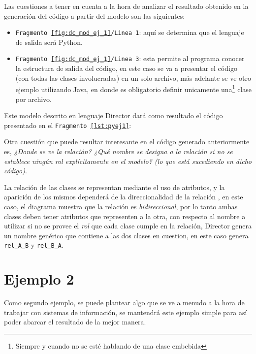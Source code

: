 Las cuestiones a tener en cuenta a la hora de analizar el resultado obtenido en
la generación del código a partir del modelo son las siguientes:
\begin{itemize}
	\item \texttt{Fragmento \ref{fig:dc_mod_ej_1}/Linea 1}: aquí se determina que
		el lenguaje de salida será Python.
	\item \texttt{Fragmento \ref{fig:dc_mod_ej_1}/Linea 3}: esta permite al
		programa conocer la estructura de salida del código, en este caso se va a
		presentar el código (con todas las clases involucradas) en un solo archivo,
		más adelante se ve otro ejemplo utilizando Java, en donde es obligatorio
		definir unicamente una\footnote{Siempre y cuando no se esté hablando de una
		clase embebida} clase por archivo.
\end{itemize}

Este modelo descrito en lenguaje Director dará como resultado el código
presentado en el \texttt{Fragmento \ref{lst:pyej1}}:



Otra cuestión que puede resultar interesante en el código generado
anteriormente es, \textit{¿Donde se ve la relación? ¿Qué nombre se designa a la
relación si no se establece ningún rol explícitamente en el modelo? (lo que
está sucediendo en dicho código)}.

La relación de las clases se representan mediante el uso de atributos, y la
aparición de los mismos dependerá de la direccionalidad de la relación
\cites{seidl2012}{pooii2017}, en este caso, el diagrama muestra que la relación es
\textit{bidireccional}, por lo tanto ambas clases deben tener atributos que
representen a la otra, con respecto al nombre a utilizar si no se provee el
\textit{rol} que cada clase cumple en la relación, Director genera un nombre
genérico que contiene a las dos clases en cuestion, en este caso genera
\texttt{rel\_A\_B} y \texttt{rel\_B\_A}.

\section{Ejemplo 2}
Como segundo ejemplo, se puede plantear algo que se ve a menudo a la hora de
trabajar con sistemas de información, se mantendrá este ejemplo simple para así
poder abarcar el resultado de la mejor manera.

